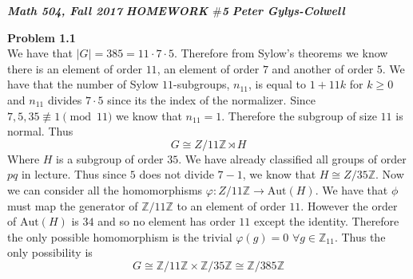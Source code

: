 \documentclass[12pt]{article}
\newenvironment{ques}[1]{\textbf{Problem #1}\vspace{1 mm}\\ }{\bigskip}
\theoremstyle{definition}
\newcommand{\Z}{\mathbb Z}
\begin{document}
\noindent \textit{\textbf{Math 504, Fall 2017}} \hspace{1.3cm}
\textit{\textbf{HOMEWORK $\#$5}} \hspace{1.3cm} \textit{\textbf{Peter
Gylys-Colwell}} 

\vspace{1cm}

\begin{ques}{1.1}
	We have that $|G| = 385 = 11 \cdot 7 \cdot 5$. Therefore from Sylow's theorems we
	know there is an element of order $11$, an element of order $7$ and another
	of order $5$. We have that the number of Sylow $11$-subgroups, $n_{11}$, is
	equal to $1 + 11k$ for $k \geq 0$ and $n_{11}$ divides $7 \cdot 5$ since
	its the index of the normalizer. Since $7,5,35 \not \equiv 1 \pmod {11}$ we
	know that $n_{11} = 1$. Therefore the subgroup of size $11$ is normal. Thus
	$$G \cong  Z/ 11\Z \rtimes H$$
	Where $H$ is a subgroup of order $35$. We have already classified all
	groups of order $pq$ in lecture. Thus since $5$ does not divide $7
	- 1$, we know that $H \cong Z/35\Z$.
	Now we can consider all the homomorphisms $\varphi :Z/11\Z \to
	\text{Aut}(H)$. We have that $\phi$ must map the generator of $\Z/11\Z$ to an
	element of order $11$. However the order of $\text{Aut}(H)$ is $34$ and so
	no element has order $11$ except the identity. Therefore the only possible
	homomorphism is the trivial $\varphi(g) = 0$ $\forall g \in \Z_{11}$. Thus
	the only possibility is
	$$G \cong \Z/11\Z \times \Z/35\Z \cong \Z/385\Z$$
\end{ques}
\end{document}
